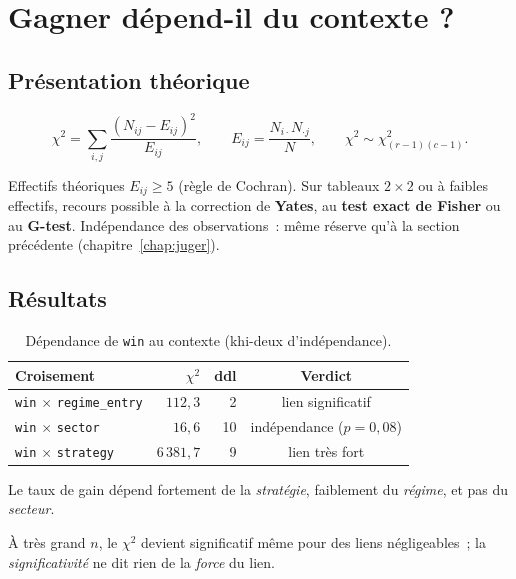 \section{Gagner dépend-il du contexte ?}
\label{sec:b1-etape3}

\subsection{Présentation théorique}
\[
  \chi^2 = \sum_{i,j}\frac{(N_{ij}-E_{ij})^2}{E_{ij}},
  \qquad E_{ij}=\frac{N_{i\cdot}N_{\cdot j}}{N},
  \qquad \chi^2 \sim \chi^2_{(r-1)(c-1)}.
\]

\begin{conditions}
Effectifs théoriques \(E_{ij}\ge 5\) (règle de Cochran). Sur tableaux
\(2\times2\) ou à faibles effectifs, recours possible à la correction de
\textbf{Yates}, au \textbf{test exact de Fisher} ou au \textbf{G-test}.
Indépendance des observations~: même réserve qu'à la section
précédente (chapitre~\ref{chap:juger}).
\end{conditions}

\subsection{Résultats}
\begin{table}[H]
\centering
\caption{Dépendance de \texttt{win} au contexte (khi-deux d'indépendance).}
\label{tab:b1-etape3}
\small
\begin{tabular}{@{}lrrc@{}}
\toprule
Croisement & $\chi^2$ & ddl & Verdict \\
\midrule
\texttt{win} $\times$ \texttt{regime\_entry} & $112{,}3$   & 2  & lien significatif \\
\texttt{win} $\times$ \texttt{sector}        & $16{,}6$    & 10 & indépendance ($p=0{,}08$) \\
\texttt{win} $\times$ \texttt{strategy}      & $6\,381{,}7$& 9  & lien très fort \\
\bottomrule
\end{tabular}
\end{table}

Le taux de gain dépend fortement de la \emph{stratégie}, faiblement du
\emph{régime}, et pas du \emph{secteur}.

\begin{limites}
À très grand \(n\), le \(\chi^2\) devient significatif même pour des
liens négligeables~; la \emph{significativité} ne dit rien de la
\emph{force} du lien. %
\end{limites}


